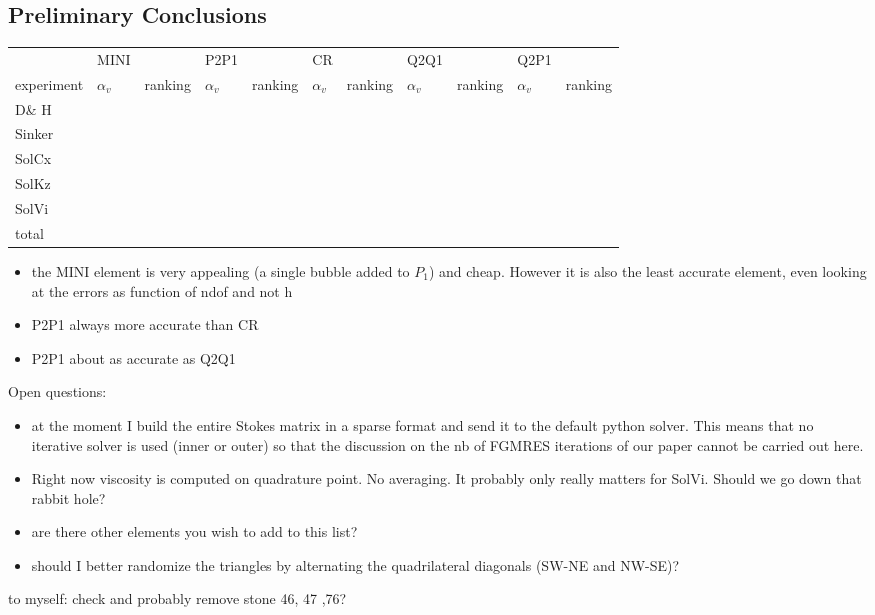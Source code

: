 \subsection*{Preliminary Conclusions}

\begin{tabular}{|l|ll|ll|ll|ll|ll|}
\hline
                & MINI       &          &  P2P1 & & CR & & Q2Q1 & & Q2P1 &  \\
experiment      & $\alpha_v$ & ranking  &    $\alpha_v$ & ranking  &    $\alpha_v$ & ranking  &    $\alpha_v$ & ranking  &    $\alpha_v$ & ranking  \\ 
\hline
\hline
D\& H & &     \\
Sinker & &  \\
SolCx & &  \\
SolKz & &  \\
SolVi & & \\
\hline
total  & & \\
\hline
\end{tabular}


\begin{itemize}
\item the MINI element is very appealing (a single bubble added to $P_1$) and cheap. However it is also 
the least accurate element, even looking at the errors as function of ndof and not h
\item P2P1 always more accurate than CR 
\item P2P1 about as accurate as Q2Q1
\end{itemize}

\vspace{1cm}

Open questions:

\begin{itemize}
\item at the moment I build the entire Stokes matrix in a sparse format and send it to the default 
python solver. This means that no iterative solver is used (inner or outer) so that the discussion 
on the nb of FGMRES iterations of our paper cannot be carried out here. 
\item Right now viscosity is computed on quadrature point. No averaging. It probably only really matters 
for SolVi. Should we go down that rabbit hole?
\item  are there other elements you wish to add to this list?
\item should I better randomize the triangles by alternating the quadrilateral diagonals (SW-NE and NW-SE)?
\end{itemize}


to myself: check and probably remove stone 46, 47 ,76?
